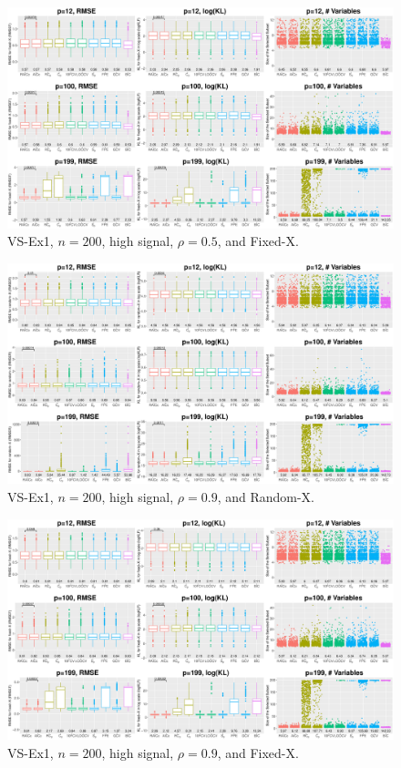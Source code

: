 \begin{figure}[!ht]
\centering
\includegraphics[width=\textwidth]{figures/supplement/fixedx_VS-Ex1_n200_hsnr_rho05.eps}
\caption{VS-Ex1, $n=200$, high signal, $\rho=0.5$, and Fixed-X.}
\end{figure}
\clearpage
\begin{figure}[!ht]
\centering
\includegraphics[width=\textwidth]{figures/supplement/randomx_VS-Ex1_n200_hsnr_rho09.eps}
\caption{VS-Ex1, $n=200$, high signal, $\rho=0.9$, and Random-X.}
\end{figure}
\begin{figure}[!ht]
\centering
\includegraphics[width=\textwidth]{figures/supplement/fixedx_VS-Ex1_n200_hsnr_rho09.eps}
\caption{VS-Ex1, $n=200$, high signal, $\rho=0.9$, and Fixed-X.}
\end{figure}
